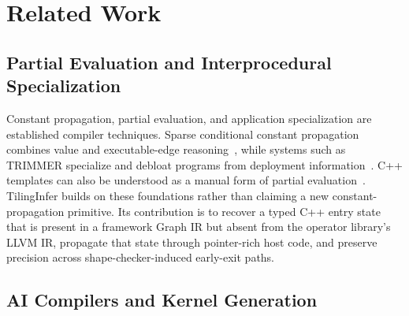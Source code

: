\section{Related Work}
\label{sec:related}

\subsection{Partial Evaluation and Interprocedural Specialization}

{\color{blue}%
Constant propagation, partial evaluation, and application specialization are established compiler techniques. Sparse conditional constant propagation combines value and executable-edge reasoning~\cite{Wegman1991ConstantPropagationConditional}, while systems such as TRIMMER specialize and debloat programs from deployment information~\cite{Sharif2018TRIMMERApplicationSpecialization}. C++ templates can also be understood as a manual form of partial evaluation~\cite{veldhuizen1998ctemplatespartialevaluation}. TilingInfer builds on these foundations rather than claiming a new constant-propagation primitive. Its contribution is to recover a typed C++ entry state that is present in a framework Graph IR but absent from the operator library's LLVM IR, propagate that state through pointer-rich host code, and preserve precision across shape-checker-induced early-exit paths.
\par}

\subsection{AI Compilers and Kernel Generation}

{\color{red}%
\cite{zheng2022dietcode}\cite{shen2021nimble}\cite{mu2023haotuner}\cite{yu2024mikpoly}\cite{Lai2023RelaxCA}
\par}

{\color{red}%
\cite{zheng2023bladedisc}\cite{fegade2022cora}
\par}

